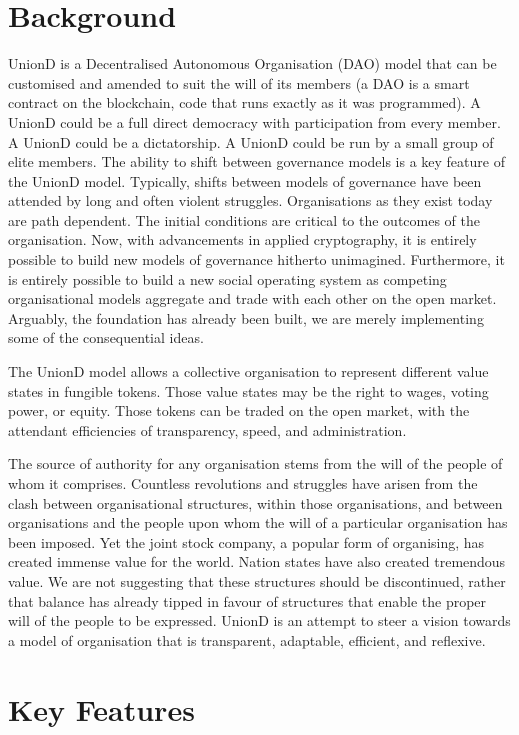 \documentclass[12pt,twocolumn]{article}
\begin{document}
\section {Background}

UnionD is a Decentralised Autonomous Organisation (DAO) model that can be customised and amended to suit the will of its members (a DAO is a smart contract on the blockchain, code that runs exactly as it was programmed). A UnionD could be a full direct democracy with participation from every member. A UnionD could be a dictatorship. A UnionD could be run by a small group of elite members. The ability to shift between governance models is a key feature of the UnionD model. Typically, shifts between models of governance have been attended by long and often violent struggles. Organisations as they exist today are path dependent. The initial conditions are critical to the outcomes of the organisation. Now, with advancements in applied cryptography, it is entirely possible to build new models of governance hitherto unimagined. Furthermore, it is entirely possible to build a new social operating system as competing organisational models aggregate and trade with each other on the open market. Arguably, the foundation has already been built, we are merely implementing some of the consequential ideas.

The UnionD model allows a collective organisation to represent different value states in fungible tokens. Those value states may be the right to wages, voting power, or equity. Those tokens can be traded on the open market, with the attendant efficiencies of transparency, speed, and administration.

The source of authority for any organisation stems from the will of the people of whom it comprises. Countless revolutions and struggles have arisen from the clash between organisational structures, within those organisations, and between organisations and the people upon whom the will of a particular organisation has been imposed. Yet the joint stock company, a popular form of organising, has created immense value for the world. Nation states have also created tremendous value. We are not suggesting that these structures should be discontinued, rather that balance has already tipped in favour of structures that enable the proper will of the people to be expressed. UnionD is an attempt to steer a vision towards a model of organisation that is transparent, adaptable, efficient, and reflexive.

\section {Key Features}
\end{document}
